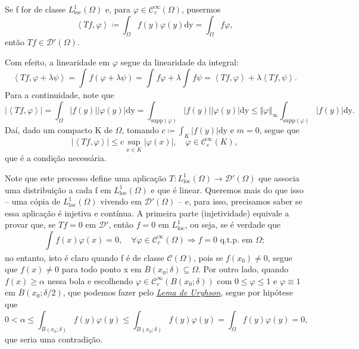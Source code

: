 \documentclass[../distribution_theory_notes.tex]{subfiles}
\begin{document}
     \begin{example}
       Se f for de classe \(L_{\mathrm{loc}}^{1}(\Omega )\) e, para \(\varphi \in \mathcal{C}_{c}^{\infty}(\Omega )\), pusermos 
         \[
           \left< Tf, \varphi  \right>\coloneqq \int_{\Omega }^{}f(y) \varphi (y) \mathrm{dy} = \int_{\Omega }^{}f\varphi,
         \]
         então \(Tf\in \mathcal{D}'(\Omega )\). 

         Com efeito, a linearidade em \(\varphi \) segue da linearidade da integral: 
           \[
             \left< Tf, \varphi +\lambda \psi  \right>=\int_{}^{}f(\varphi +\lambda \psi ) = \int_{}^{}f\varphi +  \lambda \int_{}^{}f\psi = \left< Tf, \varphi  \right> + \lambda \left< Tf, \psi  \right>.
           \]
           Para a continuidade, note que 
             \[
               | \left< Tf, \varphi  \right> |=\int_{\Omega }^{}| f(y) || \varphi (y) | \mathrm{dy} = \int_{\mathrm{supp}(\varphi )}^{}| f(y) || \varphi (y) | \mathrm{dy} \leq \Vert \varphi  \Vert_{\infty}\int_{\mathrm{supp}(\varphi )}^{}| f(y) | \mathrm{dy}.
             \]
             Daí, dado um compacto K de \(\Omega \), tomando \(c\coloneqq \int_{K}^{}| f(y) | \mathrm{dy}\) e \(m=0\), segue que 
               \[
                 | \left< Tf, \varphi  \right> |\leq c\sup_{x\in K}| \varphi (x) |,\quad \varphi \in \mathcal{C}_{c}^{\infty}(K),
               \]
               que é a condição necessária.

               Note que este processo define uma aplicação \(T:L_{\mathrm{loc}}^{1}(\Omega )\rightarrow \mathcal{D}'(\Omega )\) que associa uma distribuição a cada f em \(L_{\mathrm{loc}}^{1}(\Omega )\) e que é linear. Queremos mais do que isso -- uma cópia de \(L_{\mathrm{loc}}^{1}(\Omega )\) vivendo em \(\mathcal{D}'(\Omega )\) -- e, para isso, precisamos saber se essa aplicação é injetiva e contínua. A primeira parte (injetividade) equivale a provar que, se \(Tf=0\) em \(\mathcal{D}'\), então \(f=0\) em \(L_{\mathrm{loc}}^{1}\), ou seja, se é verdade que 
                 \[
                   \int_{}^{}f(x)\varphi (x) =0,\quad \forall \varphi \in \mathcal{C}_{c}^{\infty}(\Omega ) \Rightarrow f = 0 \text{ q.t.p. em } \Omega;
                 \]
                 no entanto, isto é claro quando f é de classe \(\mathcal{C}(\Omega )\), pois se \(f(x_{0})\neq 0\), segue que \(f(x)\neq 0\) para todo ponto x em \(\overline{B}(x_{0}; \delta )\subseteq \Omega \). Por outro lado, quando \(f(x)\geq \alpha \) nessa bola e escolhendo \(\varphi \in \mathcal{C}_{c}^{\infty}(B(x_{0}; \delta ))\) com \(0\leq \varphi \leq 1\) e \(\varphi\equiv 1\) em \(\overline{B}(x_{0}; \delta /2)\), que podemos fazer pelo \hyperlink{uryhson_lemma}{\textit{Lema de Uryhson}}, segue por hipótese que 
                   \[
                     0<\alpha \leq \int_{\overline{B}(x_{0}; \delta )}^{}f(y)\varphi (y) \leq \int_{B(x_{0}; \delta )}^{}f(y)\varphi (y) = \int_{\Omega }^{}f(y)\varphi (y) =0,
                   \]
                   que seria uma contradição.
             \end{example}
\end{document}
